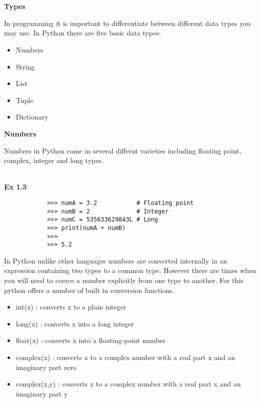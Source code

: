 \documentclass[letterpaper,11pt]{article}
\begin{document}
\\ \\
\textbf{Types}
\par{In programming it is important to differentiate between different data
types you may use. In Python there are five basic data types: }
\begin{itemize}
    \item Numbers
    \item String
    \item List
    \item Tuple
    \item Dictionary
\end{itemize}
\textbf{Numbers}
\par{Numbers in Python come in several differnt varieties
including floating point, complex, integer and long types.}
\\ \\
\begin{minipage}{.5\textwidth}
    \small \textbf{Ex 1.3}
    \begin{tcolorbox}
        \begin{footnotesize}
            \begin{verbatim}
            >>> numA = 3.2           # Floating point
            >>> numB = 2             # Integer
            >>> numC = 535633629843L # Long
            >>> print(numA + numB)
            >>> 
            >>> 5.2
            \end{verbatim}
        \end{footnotesize}
    \end{tcolorbox}
\end{minipage}
\par{In Python unlike other languages numbers are converted internally in an
expression containing two types to a common type. However there are times when
you will need to coerce a number explicitly from one type to another. For this
python offers a number of built in conversion functions.}
\\
\begin{itemize}
    \item int(x)       : converts x to a plain integer
    \item long(x)      : converts x into a long integer 
    \item float(x)     : converts x into a floating-point number
    \item complex(x)   : converts x to a complex number with a real part x and an
        imaginary part zero
    \item complex(x,y) : converts x to a complex number with a real part x and an
        imaginary part y
\end{itemize}
\end{document}
